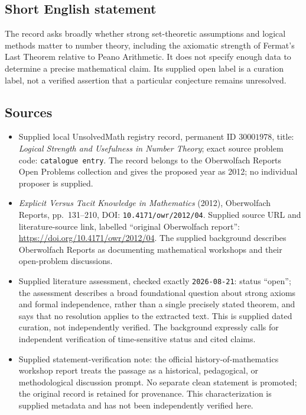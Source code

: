 \documentclass[11pt]{article}
\begin{document}
\subsection{Short English statement}
The record asks broadly whether strong set-theoretic assumptions and logical methods matter to number theory, including the axiomatic strength of Fermat's Last Theorem relative to Peano Arithmetic. It does not specify enough data to determine a precise mathematical claim. Its supplied open label is a curation label, not a verified assertion that a particular conjecture remains unresolved.
\subsection{Sources}
\begin{itemize}
\item Supplied local UnsolvedMath registry record, permanent ID \(30001978\), title: \emph{Logical Strength and Usefulness in Number Theory}; exact source problem code: \texttt{catalogue entry}. The record belongs to the Oberwolfach Reports Open Problems collection and gives the proposed year as 2012; no individual proposer is supplied.
\item \emph{Explicit Versus Tacit Knowledge in Mathematics} (2012), Oberwolfach Reports, pp.~131--210, DOI: \texttt{10.4171/owr/2012/04}. Supplied source URL and literature-source link, labelled ``original Oberwolfach report'': \url{https://doi.org/10.4171/owr/2012/04}. The supplied background describes Oberwolfach Reports as documenting mathematical workshops and their open-problem discussions.
\item Supplied literature assessment, checked exactly \texttt{2026-08-21}: status ``open''; the assessment describes a broad foundational question about strong axioms and formal independence, rather than a single precisely stated theorem, and says that no resolution applies to the extracted text. This is supplied dated curation, not independently verified. The background expressly calls for independent verification of time-sensitive status and cited claims.
\item Supplied statement-verification note: the official history-of-mathematics workshop report treats the passage as a historical, pedagogical, or methodological discussion prompt. No separate clean statement is promoted; the original record is retained for provenance. This characterization is supplied metadata and has not been independently verified here.
\end{itemize}
\end{document}
